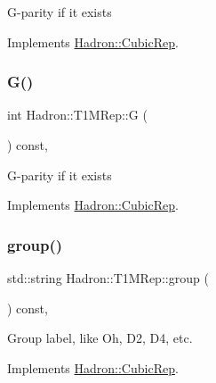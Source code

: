 G-\/parity if it exists 

Implements \mbox{\hyperlink{structHadron_1_1CubicRep_a52104e43266d1614c00bbd1c3b395458}{Hadron\+::\+Cubic\+Rep}}.

\mbox{\label{structHadron_1_1T1MRep_ae0742a7a1d446b771a85df3c9c8d8f28}} 
\subsubsection{\texorpdfstring{G()}{G()}\hspace{0.1cm}{\footnotesize\ttfamily [3/3]}}
{\footnotesize\ttfamily int Hadron\+::\+T1\+M\+Rep\+::G (\begin{DoxyParamCaption}{ }\end{DoxyParamCaption}) const\hspace{0.3cm}{\ttfamily [inline]}, {\ttfamily [virtual]}}

G-\/parity if it exists 

Implements \mbox{\hyperlink{structHadron_1_1CubicRep_a52104e43266d1614c00bbd1c3b395458}{Hadron\+::\+Cubic\+Rep}}.

\mbox{\label{structHadron_1_1T1MRep_afd1a046d8c258d11503b579df7489634}} 
\subsubsection{\texorpdfstring{group()}{group()}\hspace{0.1cm}{\footnotesize\ttfamily [1/3]}}
{\footnotesize\ttfamily std\+::string Hadron\+::\+T1\+M\+Rep\+::group (\begin{DoxyParamCaption}{ }\end{DoxyParamCaption}) const\hspace{0.3cm}{\ttfamily [inline]}, {\ttfamily [virtual]}}

Group label, like Oh, D2, D4, etc. 

Implements \mbox{\hyperlink{structHadron_1_1CubicRep_a0748f11ec87f387062c8e8981339a29c}{Hadron\+::\+Cubic\+Rep}}.

\mbox{\label{structHadron_1_1T1MRep_afd1a046d8c258d11503b579df7489634}} 
